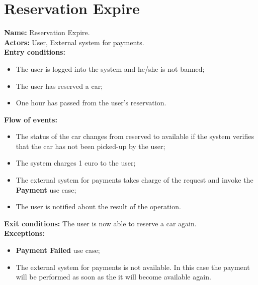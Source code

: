 \section*{Reservation Expire}
\textbf{Name:} Reservation Expire.\\
\textbf{Actors:} User, External system for payments.\\
\textbf{Entry conditions:}
\begin{itemize}
\item The user is logged into the system and he/she is not banned;
\item The user has reserved a car;
\item One hour has passed from the user's reservation.
\end{itemize}
\textbf{Flow of events:}
\begin{itemize}
\item The status of the car changes from reserved to available if the system verifies that the car has not been picked-up by the user;
\item The system charges 1 euro to the user;
\item The external system for payments takes charge of the request and invoke the \textbf{Payment} use case;
\item The user is notified about the result of the operation.
\end{itemize}
\textbf{Exit conditions:} The user is now able to reserve a car again.\\
\textbf{Exceptions:}
\begin{itemize}
\item\textbf{Payment Failed} use case;
\item The external system for payments is not available. In this case the payment will be performed as soon as the it will become available again.
\end{itemize}

